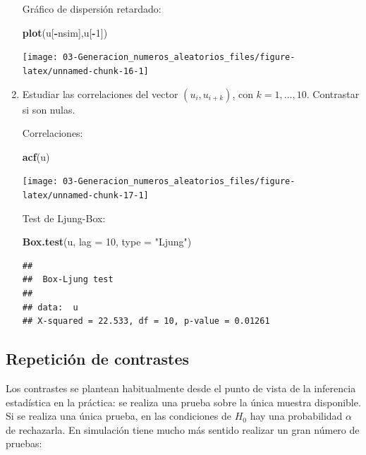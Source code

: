 \documentclass[]{book}
\newenvironment{Shaded}{\begin{snugshade}}{\end{snugshade}}
\newcommand{\KeywordTok}[1]{\textcolor[rgb]{0.13,0.29,0.53}{\textbf{#1}}}
\newcommand{\DataTypeTok}[1]{\textcolor[rgb]{0.13,0.29,0.53}{#1}}
\newcommand{\DecValTok}[1]{\textcolor[rgb]{0.00,0.00,0.81}{#1}}
\newcommand{\StringTok}[1]{\textcolor[rgb]{0.31,0.60,0.02}{#1}}
\newcommand{\OperatorTok}[1]{\textcolor[rgb]{0.81,0.36,0.00}{\textbf{#1}}}
\newcommand{\NormalTok}[1]{#1}
\theoremstyle{definition}
\theoremstyle{definition}
\theoremstyle{definition}
\theoremstyle{remark}
\begin{document}
\begin{enumerate}
  Gráfico de dispersión retardado:

\begin{Shaded}
\begin{Highlighting}[]
\KeywordTok{plot}\NormalTok{(u[}\OperatorTok{-}\NormalTok{nsim],u[}\OperatorTok{-}\DecValTok{1}\NormalTok{])}
\end{Highlighting}
\end{Shaded}

  \begin{center}\texttt{[image: 03-Generacion\_numeros\_aleatorios\_files/figure-latex/unnamed-chunk-16-1]} \end{center}
\item
  Estudiar las correlaciones del vector \((u_{i},u_{i+k})\), con
  \(k=1,...,10\). Contrastar si son nulas.

  Correlaciones:

\begin{Shaded}
\begin{Highlighting}[]
\KeywordTok{acf}\NormalTok{(u)}
\end{Highlighting}
\end{Shaded}

  \begin{center}\texttt{[image: 03-Generacion\_numeros\_aleatorios\_files/figure-latex/unnamed-chunk-17-1]} \end{center}

  Test de Ljung-Box:

\begin{Shaded}
\begin{Highlighting}[]
\KeywordTok{Box.test}\NormalTok{(u, }\DataTypeTok{lag =} \DecValTok{10}\NormalTok{, }\DataTypeTok{type =} \StringTok{"Ljung"}\NormalTok{)}
\end{Highlighting}
\end{Shaded}

\begin{verbatim}
## 
##  Box-Ljung test
## 
## data:  u
## X-squared = 22.533, df = 10, p-value = 0.01261
\end{verbatim}
\end{enumerate}

\subsection{Repetición de contrastes}\label{repeticion-de-contrastes}

Los contrastes se plantean habitualmente desde el punto de vista de la
inferencia estadística en la práctica: se realiza una prueba sobre la
única muestra disponible. Si se realiza una única prueba, en las
condiciones de \(H_{0}\) hay una probabilidad \(\alpha\) de rechazarla.
En simulación tiene mucho más sentido realizar un gran número de
pruebas:
\end{document}
